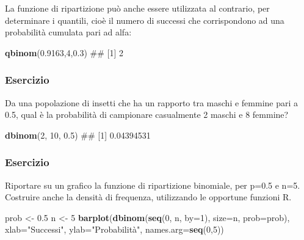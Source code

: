 \documentclass[a4paper,12pt,oneside]{book}
\newenvironment{Shaded}{\begin{snugshade}}{\end{snugshade}}
\newcommand{\KeywordTok}[1]{\textcolor[rgb]{0.13,0.29,0.53}{\textbf{#1}}}
\newcommand{\DataTypeTok}[1]{\textcolor[rgb]{0.13,0.29,0.53}{#1}}
\newcommand{\DecValTok}[1]{\textcolor[rgb]{0.00,0.00,0.81}{#1}}
\newcommand{\FloatTok}[1]{\textcolor[rgb]{0.00,0.00,0.81}{#1}}
\newcommand{\StringTok}[1]{\textcolor[rgb]{0.31,0.60,0.02}{#1}}
\newcommand{\NormalTok}[1]{#1}
\theoremstyle{definition}
\theoremstyle{definition}
\theoremstyle{definition}
\theoremstyle{remark}
\begin{document}
La funzione di ripartizione può anche essere utilizzata al contrario,
per determinare i quantili, cioè il numero di successi che corrispondono
ad una probabilità cumulata pari ad alfa:

\begin{Shaded}
\begin{Highlighting}[]
\KeywordTok{qbinom}\NormalTok{(}\FloatTok{0.9163}\NormalTok{,}\DecValTok{4}\NormalTok{,}\FloatTok{0.3}\NormalTok{)}
\NormalTok{## [1] 2}
\end{Highlighting}
\end{Shaded}

\subsubsection{Esercizio}\label{esercizio}

Da una popolazione di insetti che ha un rapporto tra maschi e femmine
pari a 0.5, qual è la probabilità di campionare casualmente 2 maschi e 8
femmine?

\begin{Shaded}
\begin{Highlighting}[]
\KeywordTok{dbinom}\NormalTok{(}\DecValTok{2}\NormalTok{, }\DecValTok{10}\NormalTok{, }\FloatTok{0.5}\NormalTok{)}
\NormalTok{## [1] 0.04394531}
\end{Highlighting}
\end{Shaded}

\subsubsection{Esercizio}\label{esercizio-8}

Riportare su un grafico la funzione di ripartizione binomiale, per p=0.5
e n=5. Costruire anche la densità di frequenza, utilizzando le opportune
funzioni R.

\begin{Shaded}
\begin{Highlighting}[]
\NormalTok{prob <-}\StringTok{ }\FloatTok{0.5}
\NormalTok{n <-}\StringTok{ }\DecValTok{5}
\KeywordTok{barplot}\NormalTok{(}\KeywordTok{dbinom}\NormalTok{(}\KeywordTok{seq}\NormalTok{(}\DecValTok{0}\NormalTok{, n, }\DataTypeTok{by=}\DecValTok{1}\NormalTok{), }\DataTypeTok{size=}\NormalTok{n, }\DataTypeTok{prob=}\NormalTok{prob),}
          \DataTypeTok{xlab=}\StringTok{"Successi"}\NormalTok{, }\DataTypeTok{ylab=}\StringTok{"Probabilità"}\NormalTok{,}
          \DataTypeTok{names.arg=}\KeywordTok{seq}\NormalTok{(}\DecValTok{0}\NormalTok{,}\DecValTok{5}\NormalTok{))}
\end{Highlighting}
\end{Shaded}
\end{document}
